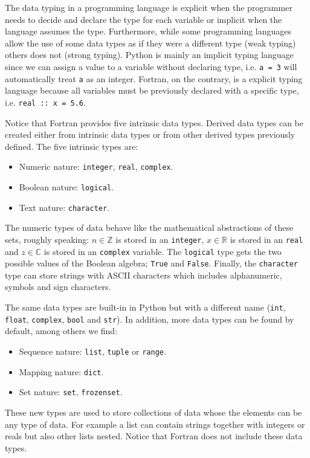 The data typing in a programming language is explicit when the programmer needs to decide and declare the type for each variable or implicit when the language assumes the type. 
Furthermore, while some programming languages allow the use of some data types as if they were a different type (weak typing) others does not (strong typing). 
Python is mainly an implicit typing language since we can assign a value to a variable without declaring type, i.e. \texttt{a = 3} will automatically treat \texttt{a} as an integer. 
Fortran, on the contrary, is a explicit typing language because all variables must be previously declared with a specific type, i.e. \texttt{real :: x = 5.6}.




Notice that Fortran provides five intrinsic data types. 
Derived data types can be created either from intrinsic data types or from other derived types previously defined.
The five intrinsic types are:
\begin{itemize}
    \item Numeric nature: \texttt{integer}, \texttt{real}, \texttt{complex}. 
    \item Boolean nature: \texttt{logical}.
    \item Text nature: \texttt{character}.
\end{itemize}
The numeric types of data behave like the mathematical abstractions of these sets, 
roughly speaking: $n\in \mathbb{Z}$ is stored in an \texttt{integer}, $x\in \mathbb{R}$ is stored in an \texttt{real} and $z\in \mathbb{C}$ is stored in an \texttt{complex} variable.
The \texttt{logical} type gets the two possible values of the Boolean algebra; \texttt{True} and \texttt{False}. 
Finally, the \texttt{character} type can store strings with ASCII characters which includes alphanumeric, symbols and sign characters.   




The same data types are built-in in Python but with a different name (\texttt{int}, \texttt{float}, \texttt{complex}, \texttt{bool} and \texttt{str}). 
In addition, more data types can be found by default, among others we find:
\begin{itemize}
    \item Sequence nature: \texttt{list}, \texttt{tuple} or \texttt{range}.
    \item Mapping nature: \texttt{dict}.
    \item Set nature: \texttt{set}, \texttt{frozenset}.
\end{itemize}
These new types are used to store collections of data whose the elements can be any type of data. 
For example a list can contain strings together with integers or reals but also other lists nested. 
Notice that Fortran does not include these data types.




